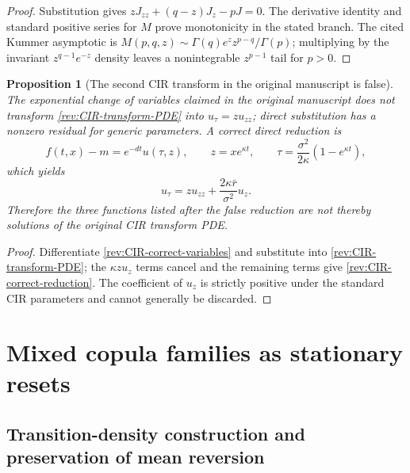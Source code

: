 \documentclass[11pt]{article}
\newtheorem{proposition}[definition]{Proposition}
\theoremstyle{remark}
\begin{document}
\begin{proof}
Substitution gives
$zJ_{zz}+(q-z)J_z-pJ=0$.  The derivative identity and standard positive series
for $M$ prove monotonicity in the stated branch.  The cited Kummer asymptotic is
$M(p,q,z)\sim\Gamma(q)e^zz^{p-q}/\Gamma(p)$; multiplying by the invariant
$z^{q-1}e^{-z}$ density leaves a nonintegrable $z^{p-1}$ tail for $p>0$.
\end{proof}

\begin{proposition}[The second CIR transform in the original manuscript is false]
\label{rev:prop-CIR-false-transform}
The exponential change of variables claimed in the original manuscript does
not transform \eqref{rev:CIR-transform-PDE} into $u_\tau=zu_{zz}$; direct
substitution has a nonzero residual for generic parameters.  A correct direct
reduction is
\begin{equation}
f(t,x)-m=e^{-dt}u(\tau,z),\qquad
z=xe^{\kappa t},\qquad
\tau=\frac{\sigma^2}{2\kappa}(1-e^{\kappa t}),
\label{rev:CIR-correct-variables}
\end{equation}
which yields
\begin{equation}
u_\tau=zu_{zz}+\frac{2\kappa\bar r}{\sigma^2}u_z.
\label{rev:CIR-correct-reduction}
\end{equation}
Therefore the three functions listed after the false reduction are not thereby
solutions of the original CIR transform PDE.
\end{proposition}

\begin{proof}
Differentiate \eqref{rev:CIR-correct-variables} and substitute into
\eqref{rev:CIR-transform-PDE}; the $\kappa z u_z$ terms cancel and the remaining
terms give \eqref{rev:CIR-correct-reduction}.  The coefficient of $u_z$ is
strictly positive under the standard CIR parameters and cannot generally be
discarded.
\end{proof}

\section{Mixed copula families as stationary resets}

\subsection{Transition-density construction and preservation of mean reversion}
\end{document}
